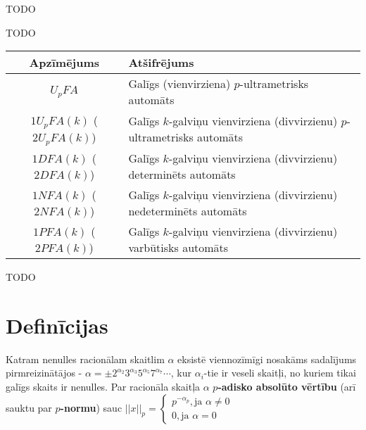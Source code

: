 \documentclass{ludis}
\begin{document}
\maketitle

\begin{abstract-lv}
TODO
\end{abstract-lv}
\clearpage

\begin{abstract-en}
TODO
\end{abstract-en}


\tableofcontents

\setlength\LTleft{0pt}
\setlength\LTright{0pt}
\begin{longtable}{| c | p{28em} |}
  \hline
  \textbf{Apzīmējums} & \textbf{Atšifrējums}\\ 
  \endhead

  \hline
  $U_pFA$ & Galīgs (vienvirziena) $p$-ultrametrisks automāts\\
  $1U_pFA(k)$ ($2U_pFA(k)$) &  Galīgs $k$-galviņu vienvirziena (divvirzienu) $p$-ultrametrisks automāts\\
  $1DFA(k)$ ($2DFA(k)$) &  Galīgs $k$-galviņu vienvirziena (divvirzienu) determinēts automāts\\
  $1NFA(k)$ ($2NFA(k)$) &  Galīgs $k$-galviņu vienvirziena (divvirzienu) nedeterminēts automāts\\
  $1PFA(k)$ ($2PFA(k)$) &  Galīgs $k$-galviņu vienvirziena (divvirzienu) varbūtisks automāts\\
  \hline
\end{longtable}

TODO

\chapter {Definīcijas}
\begin{definicija}
Katram nenulles racionālam skaitlim $\alpha$ eksistē viennozīmīgi nosakāms sadalījums pirmreizinātājos - $\alpha = \pm 2^{\alpha_2}3^{\alpha_3}5^{\alpha_5}7^{\alpha_7} \cdots$, kur $\alpha_i$-tie ir veseli skaitļi, no kuriem tikai galīgs skaits ir nenulles. Par racionāla skaitļa $\alpha$ \textbf{$p$-adisko absolūto vērtību} (arī sauktu par \textbf{$p$-normu}) sauc 
$||x||_p = \begin{cases}
p^{-\alpha_p}, \textrm{ja } \alpha \neq 0 \\
0, \textrm{ja } \alpha = 0
\end{cases} $
\end{definicija}
\end{document}
